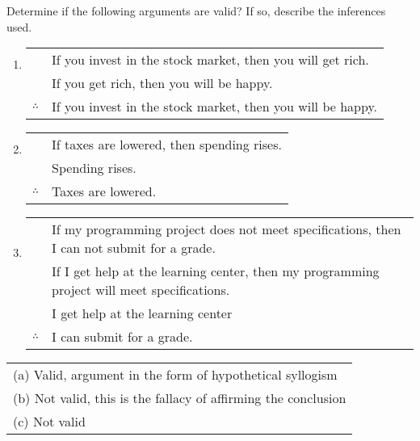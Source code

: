 \documentclass[12pt,addpoints]{exam}
\begin{document}
\begin{questions}
\question[6] Determine if the following arguments are valid? If so, describe the inferences used.
	\begin{enumerate}[label=(\alph*),itemsep=0pt,parsep=0pt,
    	topsep=0pt,partopsep=0pt]
    	\item \begin{tabular}{cl}
    		 & If you invest in the stock market, then you will get rich. \\
    		 & If you get rich, then you will be happy. \\
    		 \cline{2-2} 
    		$\therefore$ & If you invest in the stock market, then you will be happy.
    		\end{tabular} 
    		\smallskip
    	\item \begin{tabular}{cl}
    		& If taxes are lowered, then spending rises. \\
    		& Spending rises. \\
    		\cline{2-2} 
    		$\therefore$ & Taxes are lowered.
    		\end{tabular}
    		\smallskip
    	\item \begin{tabular}{cl}
    		& If my programming project does not meet specifications, then I can not submit for a grade. \\
    		& If I get help at the learning center, then my programming project will meet specifications. \\
    		& I get help at the learning center \\
    		\cline{2-2}
    		$\therefore$ & I can submit for a grade.
    		\end{tabular}
    \end{enumerate}
    \ifprintanswers
        \vspace{-12pt}
    \fi
\begin{solution}  
    \begin{tabular}{l}
    	(a) Valid, argument in the form of hypothetical syllogism \\
    	(b) Not valid, this is the fallacy of affirming the conclusion\\
    	(c) Not valid
    \end{tabular}
\end{solution}



\end{questions}
\end{document}

